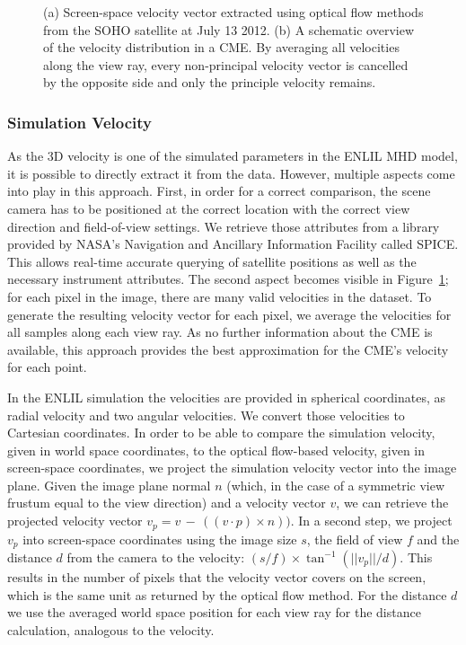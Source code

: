 \documentclass[journal]{vgtc}                %
\begin{document}
\begin{figure}
{  \label{fig:simulationvelocitygathering}
}
\caption{(a) Screen-space velocity vector extracted using optical flow methods from the SOHO satellite at July 13 2012. (b) A schematic overview of the velocity distribution in a CME. By averaging all velocities along the view ray, every non-principal velocity vector is cancelled by the opposite side and only the principle velocity remains.}
\end{figure}

\subsubsection{Simulation Velocity} \label{sec:simulationvelocity}
As the 3D velocity is one of the simulated parameters in the ENLIL MHD model, it is possible to directly extract it from the data. However, multiple aspects come into play in this approach. First, in order for a correct comparison, the scene camera has to be positioned at the correct location with the correct view direction and field-of-view settings. We retrieve those attributes from a library provided by NASA's Navigation and Ancillary Information Facility called SPICE. This allows real-time accurate querying of satellite positions as well as the necessary instrument attributes. The second aspect becomes visible in Figure~\ref{fig:simulationvelocitygathering}; for each pixel in the image, there are many valid velocities in the dataset. To generate the resulting velocity vector for each pixel, we average the velocities for all samples along each view ray. As no further information about the CME is available, this approach provides the best approximation for the CME's velocity for each point.

In the ENLIL simulation the velocities are provided in spherical coordinates, as radial velocity and two angular velocities. We convert those velocities to Cartesian coordinates. In order to be able to compare the simulation velocity, given in world space coordinates, to the optical flow-based velocity, given in screen-space coordinates, we project the simulation velocity vector into the image plane. Given the image plane normal $n$ (which, in the case of a symmetric view frustum equal to the view direction) and a velocity vector $v$, we can retrieve the projected velocity vector $v_p = v\,-\,\left(\left(v \cdot p \right) \times n \right))$. In a second step, we project $v_p$ into screen-space coordinates using the image size $s$, the field of view $f$ and the distance $d$ from the camera to the velocity: $\left(s / f \right) \times \tan^{-1}\left( ||v_p|| / d \right)$. This results in the number of pixels that the velocity vector covers on the screen, which is the same unit as returned by the optical flow method. For the distance $d$ we use the averaged world space position for each view ray for the distance calculation, analogous to the velocity. 
\end{document}
